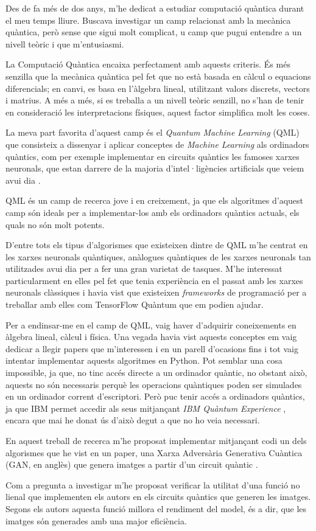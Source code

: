 Des de fa més de dos anys, m'he dedicat a estudiar computació quàntica durant el meu temps lliure. Buscava investigar un camp relacionat amb la mecànica quàntica, però sense que sigui molt complicat, u  camp que pugui entendre a un nivell teòric i que m'entusiasmi.

La Computació Quàntica encaixa perfectament amb aquests criteris. És més senzilla que la mecànica quàntica pel fet que no està basada en càlcul o equacions diferencials; en canvi, es basa en l'àlgebra lineal, utilitzant valors discrets, vectors i matrius. A més a més, si es treballa a un nivell teòric senzill, no s'han de tenir en consideració les interpretacions físiques, aquest factor simplifica molt les coses.

La meva part favorita d'aquest camp és el \textit{Quantum Machine Learning} (QML) que consisteix a dissenyar i aplicar conceptes de \textit{Machine Learning} als ordinadors quàntics, com per exemple implementar en circuits quàntics les famoses xarxes neuronals, que estan darrere de la majoria d'intel·ligències artificials que veiem avui dia \cite{schuld:2014}.

QML és un camp de recerca jove i en creixement, ja que els algoritmes d'aquest camp són ideals per a implementar-los amb els ordinadors quàntics actuals, els quals no són molt potents.

D'entre tots els tipus d'algorismes que existeixen dintre de QML m'he centrat en les xarxes neuronals quàntiques, anàlogues quàntiques de les xarxes neuronals tan utilitzades avui dia per a fer una gran varietat de tasques. M'he interessat particularment en elles pel fet que tenia experiència en el passat amb les xarxes neuronals clàssiques i havia vist que existeixen \textit{frameworks} de programació per a treballar amb elles com TensorFlow Quàntum \cite{tfq} que em podien ajudar.

Per a endinsar-me en el camp de QML, vaig haver d'adquirir coneixements en àlgebra lineal, càlcul i física. Una vegada havia vist aquests conceptes em vaig dedicar a llegir papers que m'interessen i en un parell d'ocasions fins i tot vaig intentar implementar aquests algoritmes en Python. Pot semblar una cosa impossible, ja que, no tinc accés directe a un ordinador quàntic, no obstant això, aquests no són necessaris perquè les operacions quàntiques poden ser simulades en un ordinador corrent d'escriptori. Però puc tenir accés a ordinadors quàntics, ja que IBM permet accedir als seus mitjançant \textit{IBM Quàntum Experience} \cite{IBM_Q}, encara que mai he donat ús d'això degut a que no ho veia necessari.

En aquest treball de recerca m'he proposat implementar mitjançant codi un dels algorismes que he vist en un paper, una Xarxa Adversària Generativa Cuàntica (GAN, en anglès) \cite{GAN2014} que genera imatges a partir d'un circuit quàntic \cite{QGAN_exp}.

Com a pregunta a investigar m'he proposat verificar la utilitat d'una funció no lienal que implementen els autors en els circuits quàntics que generen les imatges. Segons els autors aquesta funció millora el rendiment del model, és a dir, que les imatges són generades amb una major eficiència.


